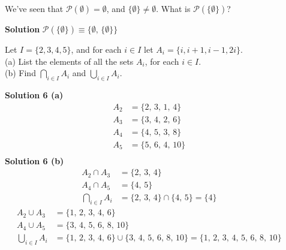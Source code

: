 \begin{tcolorbox}[title=Problem 3, breakable]
    We've seen that $\mathcal{P}(\emptyset) = {\emptyset}$, and $\{\emptyset\} \not = \emptyset$.
    What is $\mathcal{P}(\{\emptyset\})$?
\end{tcolorbox}

\textbf{Solution}
$\mathcal{P}(\{\emptyset\}) \equiv \{\emptyset\text{, } \{\emptyset\}\}$

\begin{tcolorbox}[title=Problem 6, breakable]
    Let $I = \{2, 3, 4, 5\}$, and for each $i \in I$ let $A_i = \{i, i + 1, i - 1, 2i\}$. \\
    (a) List the elements of all the sets $A_i$, for each $i \in I$. \\
    (b) Find $\bigcap_{i \in I} A_i$ and $\bigcup_{i \in I} A_i$.
\end{tcolorbox}

\textbf{Solution 6 (a)}
    \begin{align*}
        A_2 &= \{2\text{, }3\text{, }1\text{, }4\} && \\
        A_3 &= \{3\text{, }4\text{, }2\text{, }6\} && \\
        A_4 &= \{4\text{, }5\text{, }3\text{, }8\} && \\
        A_5 &= \{5\text{, }6\text{, }4\text{, }10\} && \\
    \end{align*}
\textbf{Solution 6 (b)}
    \begin{align*}
        A_2 \cap A_3 &= \{2\text{, }3\text{, }4\} && \\
        A_4 \cap A_5 &= \{4\text{, }5\} && \\
        \bigcap_{i \in I} A_i &= \{2\text{, }3\text{, }4\} \cap \{4\text{, }5\} = \{4\}
    \end{align*}
    \begin{align*}
        A_2 \cup A_3 &= \{1\text{, }2\text{, }3\text{, }4\text{, }6\} && \\
        A_4 \cup A_5 &= \{3\text{, }4\text{, }5\text{, }6\text{, }8\text{, }10\} && \\
        \bigcup_{i \in I} A_i &= \{1\text{, }2\text{, }3\text{, }4\text{, }6\} 
            \cup \{3\text{, }4\text{, }5\text{, }6\text{, }8\text{, }10\}
            = \{1\text{, }2\text{, }3\text{, }4\text{, }5\text{, }6\text{, }8\text{, }10\}
    \end{align*}

